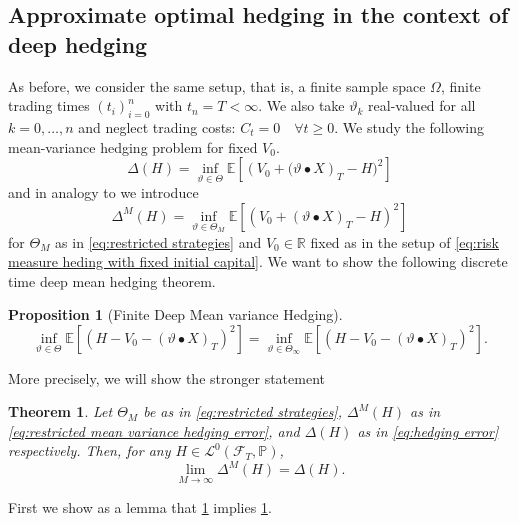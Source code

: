 \documentclass[11pt,a4paper,twoside,openany]{report}
\theoremstyle{plain} %
\newtheorem{theorem}{Theorem}[chapter]
\newtheorem{proposition}[proposition]{Proposition}
\theoremstyle{definition} %
\theoremstyle{remark} %
\let\parencite\authnumparencite
\begin{document}
\subsection{Approximate optimal hedging in the context of deep hedging}
As before, we consider the same setup, that is, a finite sample space \(\Omega\), finite trading times \((t_i)_{i=0}^n\) with \(t_n=T<\infty\). We also take \(\vartheta_k\) real-valued for all \(k=0,\dots,n\) and  neglect trading costs: \(C_t=0\quad \forall t\geq 0\). We study the following mean-variance hedging problem for fixed \(V_0\).
\begin{equation}\label{eq:hedging error}
    \Delta(H) = \inf_{\vartheta\in\Theta}\mathbb{E}[\left(V_0+(\vartheta\bullet X\right)_T-H)^2]
\end{equation}
and in analogy to \parencite[Thm.~4.9.]{Buehler2018DeepHedging} we introduce
\begin{equation}\label{eq:restricted mean variance hedging error}
    \Delta^M(H) = \inf_{\vartheta\in\Theta_M}\mathbb{E}[\left(V_0+(\vartheta\bullet X)_T-H\right)^2]
\end{equation}
for \(\Theta_M\) as in \cref{eq:restricted strategies} and \(V_0\in\mathbb{R}\) fixed as in the setup of \cref{eq:risk measure heding with fixed initial capital}. We want to show the following discrete time deep mean hedging theorem.
\begin{proposition}[Finite Deep Mean variance Hedging]\label{prop:finite deep mean variance hedging}
    \begin{equation}
        \inf_{\vartheta\in\Theta}\mathbb{E}[\left(H-V_0-(\vartheta\bullet X)_T\right)^2]=\inf_{\vartheta\in\Theta_{\infty}}\mathbb{E}[\left(H-V_0-(\vartheta\bullet X)_T\right)^2].
    \end{equation}
\end{proposition}
More precisely, we will show the stronger statement
\begin{theorem}\label{thm:strong discrete deep mean variance hedging}
Let \(\Theta_M\) be as in \cref{eq:restricted strategies}, \(\Delta^M(H)\) as in \cref{eq:restricted mean variance hedging error}, and \(\Delta(H)\) as in \cref{eq:hedging error} respectively. Then, for any \(H\in\mathcal{L}^0(\mathcal{F}_T,\mathbb{P})\),
    \begin{equation}
        \lim_{M\to\infty}\Delta^M(H)=\Delta(H).
    \end{equation}
\end{theorem}
First we show as a lemma that \cref{thm:strong discrete deep mean variance hedging} implies \cref{prop:finite deep mean variance hedging}.
\end{document}
